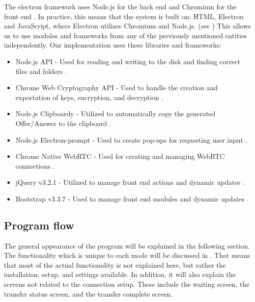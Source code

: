     The electron framework uses Node.js for the back end and Chromium for the front end \cite{url_electron}. In practice, this means that the system is built on: HTML, Electron and JavaScript, where Electron utilizes Chromium and Node.js. (see ) This allows us to use modules and frameworks from any of the previously mentioned entities independently. Our implementation uses these libraries and frameworks:
    \begin{itemize}
    \item Node.js API - Used for reading and writing to the disk and finding correct files and folders \cite{url_node}.
    \item Chrome Web Cryptography API - Used to handle the creation and exportation of keys, encryption, and decryption \cite{ar_webcrypto,url_webcr_supp}.
    \item Node.js Clipboardy - Utilized to automatically copy the generated Offer/Answer to the clipboard \cite{url_clipboardy}.
    \item Node.js Electron-prompt - Used to create pop-ups for requesting user input \cite{url_ele-prompt}.
    \item Chrome Native WebRTC - Used for creating and managing WebRTC connections \cite{url_webrtc_chrome}.
    \item jQuery v3.2.1 - Utilized to manage front end actions and dynamic updates \cite{url_jQuery}.
    \item Bootstrap v3.3.7 - Used to manage front end modules and dynamic updates \cite{url_bootstrap}.
    \end{itemize}

  \subsection{Program flow}
  \label{sec:progflow}
  The general appearance of the program will be explained in the following section. The functionality which is unique to each mode will be discussed in . That means that most of the actual functionality is not explained here, but rather the installation, setup, and settings available. In addition, it will also explain the screens not related to the connection setup. These include the waiting screen, the transfer status screen, and the transfer complete screen.

